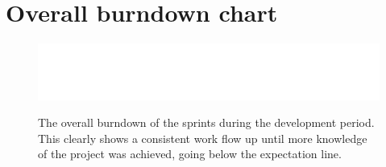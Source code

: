 \section{Overall burndown chart}
\begin{figure}[H]
  \centering
  \includegraphics{images/overall-burndown}
  \label{fig:overall_burndown}
  \caption{The overall burndown of the sprints during the development period. This clearly shows a consistent work flow up until more knowledge of the project was achieved, going below the expectation line.}
\end{figure}

